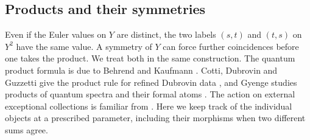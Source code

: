 \subsection{Products and their symmetries}

Even if the Euler values on $Y$ are distinct, the two labels $(s,t)$ and $(t,s)$ on $Y^2$ have the same value. A symmetry of $Y$ can force further coincidences before one takes the product. We treat both in the same construction. The quantum product formula is due to Behrend and Kaufmann \cite{Beh,Kau}. Cotti, Dubrovin and Guzzetti give the product rule for refined Dubrovin data \cite[Remark~5.4 and Proposition~5.11]{CDG}, and Gyenge studies products of quantum spectra and their formal atoms \cite[\S\S4--5]{Gye}. The action on external exceptional collections is familiar from \cite[Lemmas~3.10--3.11]{BDM}. Here we keep track of the individual objects at a prescribed parameter, including their morphisms when two different sums agree.

